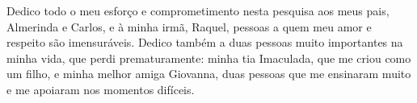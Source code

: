 Dedico todo o meu esforço e comprometimento nesta pesquisa aos meus pais, Almerinda e Carlos, e à minha irmã, Raquel, pessoas a quem meu amor e respeito são imensuráveis. Dedico também a duas pessoas muito importantes na minha vida, que perdi prematuramente: minha tia Imaculada, que me criou como um filho, e minha melhor amiga Giovanna, duas pessoas que me ensinaram muito e me apoiaram nos momentos difíceis.